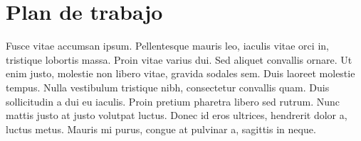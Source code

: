 \section{Plan de trabajo}
\label{sec:plan_trabajo}
Fusce vitae accumsan ipsum. Pellentesque mauris leo, iaculis vitae orci in, tristique lobortis massa. Proin vitae varius dui. Sed aliquet convallis ornare. Ut enim justo, molestie non libero vitae, gravida sodales sem. Duis laoreet molestie tempus. Nulla vestibulum tristique nibh, consectetur convallis quam. Duis sollicitudin a dui eu iaculis. Proin pretium pharetra libero sed rutrum. Nunc mattis justo at justo volutpat luctus. Donec id eros ultrices, hendrerit dolor a, luctus metus. Mauris mi purus, congue at pulvinar a, sagittis in neque. 